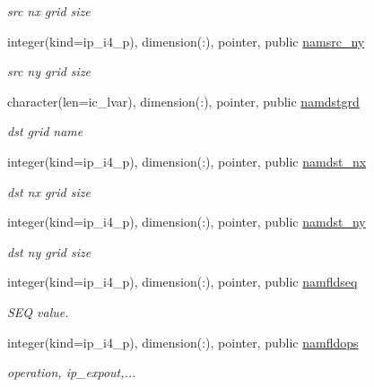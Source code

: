 \begin{DoxyCompactItemize}
\begin{DoxyCompactList}\small\item\em src nx grid size \end{DoxyCompactList}\item 
integer(kind=ip\+\_\+i4\+\_\+p), dimension(\+:), pointer, public \hyperlink{namespacemod__oasis__namcouple_ab82c80f007b37865172ddb033a1abb36}{namsrc\+\_\+ny}
\begin{DoxyCompactList}\small\item\em src ny grid size \end{DoxyCompactList}\item 
character(len=ic\+\_\+lvar), dimension(\+:), pointer, public \hyperlink{namespacemod__oasis__namcouple_a7a2ed64b0670db38d2287f5d452060e4}{namdstgrd}
\begin{DoxyCompactList}\small\item\em dst grid name \end{DoxyCompactList}\item 
integer(kind=ip\+\_\+i4\+\_\+p), dimension(\+:), pointer, public \hyperlink{namespacemod__oasis__namcouple_a6add94418eefdaefd78cd971888a5826}{namdst\+\_\+nx}
\begin{DoxyCompactList}\small\item\em dst nx grid size \end{DoxyCompactList}\item 
integer(kind=ip\+\_\+i4\+\_\+p), dimension(\+:), pointer, public \hyperlink{namespacemod__oasis__namcouple_a9035fc89396bad9574c88642d3aac5f0}{namdst\+\_\+ny}
\begin{DoxyCompactList}\small\item\em dst ny grid size \end{DoxyCompactList}\item 
integer(kind=ip\+\_\+i4\+\_\+p), dimension(\+:), pointer, public \hyperlink{namespacemod__oasis__namcouple_a54ccfe0380fc1c89d085f37a044a297e}{namfldseq}
\begin{DoxyCompactList}\small\item\em S\+EQ value. \end{DoxyCompactList}\item 
integer(kind=ip\+\_\+i4\+\_\+p), dimension(\+:), pointer, public \hyperlink{namespacemod__oasis__namcouple_a4841e350d91926f5f8403e73442c76ad}{namfldops}
\begin{DoxyCompactList}\small\item\em operation, ip\+\_\+expout,... \end{DoxyCompactList}\item 

\end{DoxyCompactItemize}
